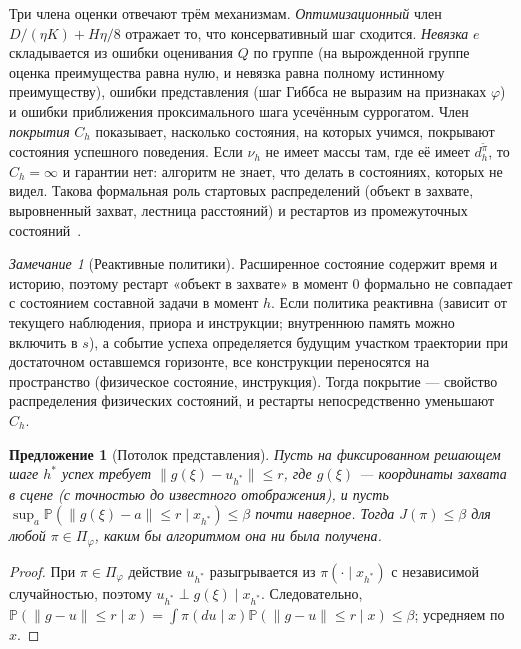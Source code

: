 \documentclass[11pt,a4paper]{article}
\theoremstyle{plain}
\newtheorem{proposition}[theorem]{Предложение}
\theoremstyle{definition}
\theoremstyle{remark}
\newtheorem{remark}[theorem]{Замечание}
\newcommand{\PP}{\mathbb{P}}
\newcommand{\pit}{\tilde\pi}
\begin{document}
Три члена оценки отвечают трём механизмам. \emph{Оптимизационный} член $D/(\eta K)+H\eta/8$ отражает то, что консервативный шаг сходится. \emph{Невязка} $e$ складывается из ошибки оценивания $Q$ по группе (на вырожденной группе оценка преимущества равна нулю, и невязка равна полному истинному преимуществу), ошибки представления (шаг Гиббса не выразим на признаках $\varphi$) и ошибки приближения проксимального шага усечённым суррогатом. Член \emph{покрытия} $C_h$ показывает, насколько состояния, на которых учимся, покрывают состояния успешного поведения. Если $\nu_h$ не имеет массы там, где её имеет $d^{\pit}_h$, то $C_h=\infty$ и гарантии нет: алгоритм не знает, что делать в состояниях, которых не видел. Такова формальная роль стартовых распределений (объект в захвате, выровненный захват, лестница расстояний) и рестартов из промежуточных состояний~\cite{kakade-langford,agarwal}.

\begin{remark}[Реактивные политики]\label{rem:reactive}
Расширенное состояние содержит время и историю, поэтому рестарт «объект в захвате» в момент $0$ формально не совпадает с состоянием составной задачи в момент $h$. Если политика реактивна (зависит от текущего наблюдения, приора и инструкции; внутреннюю память можно включить в $s$), а событие успеха определяется будущим участком траектории при достаточном оставшемся горизонте, все конструкции переносятся на пространство (физическое состояние, инструкция). Тогда покрытие --- свойство распределения физических состояний, и рестарты непосредственно уменьшают $C_h$.
\end{remark}

\begin{proposition}[Потолок представления]\label{prop:ceiling}
Пусть на фиксированном решающем шаге $h^\ast$ успех требует $\|g(\xi)-u_{h^\ast}\|\le r$, где $g(\xi)$ --- координаты захвата в сцене (с точностью до известного отображения), и пусть $\sup_a\PP(\|g(\xi)-a\|\le r\mid x_{h^\ast})\le\beta$ почти наверное. Тогда $J(\pi)\le\beta$ для любой $\pi\in\Pi_\varphi$, каким бы алгоритмом она ни была получена.
\end{proposition}
\begin{proof}
При $\pi\in\Pi_\varphi$ действие $u_{h^\ast}$ разыгрывается из $\pi(\cdot\mid x_{h^\ast})$ с независимой случайностью, поэтому $u_{h^\ast}\perp g(\xi)\mid x_{h^\ast}$. Следовательно, $\PP(\|g-u\|\le r\mid x)=\int\pi(du\mid x)\PP(\|g-u\|\le r\mid x)\le\beta$; усредняем по $x$.
\end{proof}
\end{document}
